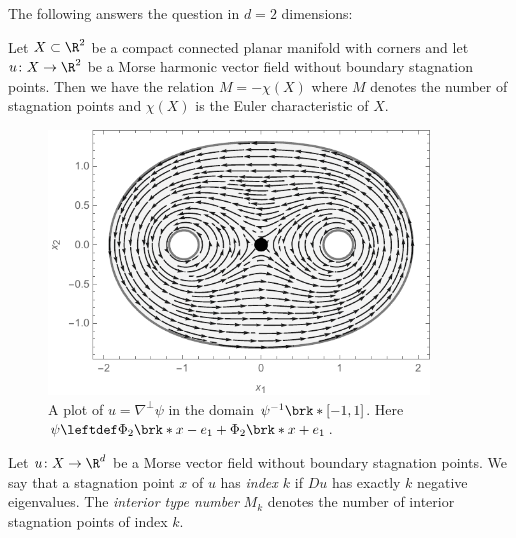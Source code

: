 \begin{frame}
  The following answers the question in $d=2$ dimensions:
  \begin{proposition}\label{pr:n2_hvf_noInflowNoOutflow}
    Let $X\subset\R^2$ be a compact connected planar manifold with corners
    and let $u\colon X\to\R^2$ be
    a Morse harmonic vector field without boundary stagnation points.
    Then we have the relation $M=-\chi(X)$ where $M$ denotes the number of stagnation points and
    $\chi(X)$ is the Euler characteristic of $X$.
  \end{proposition}
\end{frame}

\begin{frame}
  \begin{figure}
    \centering
    \includegraphics[width=0.9\textwidth]{../Plots/n2_hvf_noInflowNoOutflow_symmetric_gray_2.pdf}
    \caption{A plot of $u=\nabla^\perp\psi$ in the domain $\psi^{-1}\brk*{[-1,1]}$.
      Here $\psi\leftdef\Phi_2\brk*{x-e_1}+\Phi_2\brk*{x+e_1}$.}
    \label{pl:n2_hvf_noInflowNoOutflow}
  \end{figure}
\end{frame}

\begin{frame}
  \begin{definition}
    Let $u\colon X\to\R^d$ be a Morse vector field without boundary stagnation points.
    We say that a stagnation point $x$ of $u$ has \emph{index $k$} if $Du$ has exactly $k$ negative eigenvalues.
    The \emph{interior type number} $M_k$ denotes the number of interior stagnation points of index $k$.
  \end{definition}
\end{frame}

